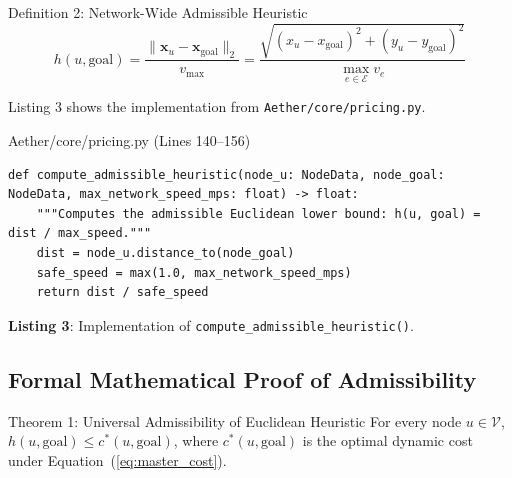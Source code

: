 \documentclass[10pt,a4paper]{article}
\begin{document}
\begin{specbox}{Definition 2: Network-Wide Admissible Heuristic}
\begin{equation}
h(u, \text{goal}) = \frac{\|\mathbf{x}_u - \mathbf{x}_{\text{goal}}\|_2}{v_{\max}} = \frac{\sqrt{(x_u - x_{\text{goal}})^2 + (y_u - y_{\text{goal}})^2}}{\max_{e \in \mathcal{E}} v_e}
\label{eq:heuristic}
\end{equation}
\end{specbox}

Listing 3 shows the implementation from \texttt{Aether/core/pricing.py}.

\begin{codebox}{Aether/core/pricing.py (Lines 140--156)}
\begin{lstlisting}[style=AetherPython]
def compute_admissible_heuristic(node_u: NodeData, node_goal: NodeData, max_network_speed_mps: float) -> float:
    """Computes the admissible Euclidean lower bound: h(u, goal) = dist / max_speed."""
    dist = node_u.distance_to(node_goal)
    safe_speed = max(1.0, max_network_speed_mps)
    return dist / safe_speed
\end{lstlisting}
\end{codebox}
\vspace{-3pt}
\begin{center}\sffamily\footnotesize\textbf{Listing 3}: Implementation of \texttt{compute\_admissible\_heuristic()}.\end{center}

\subsection{Formal Mathematical Proof of Admissibility}

\begin{proofbox}{Theorem 1: Universal Admissibility of Euclidean Heuristic}
For every node $u \in \mathcal{V}$, $h(u, \text{goal}) \le c^*(u, \text{goal})$, where $c^*(u, \text{goal})$ is the optimal dynamic cost under Equation~(\ref{eq:master_cost}).
\end{proofbox}
\end{document}
